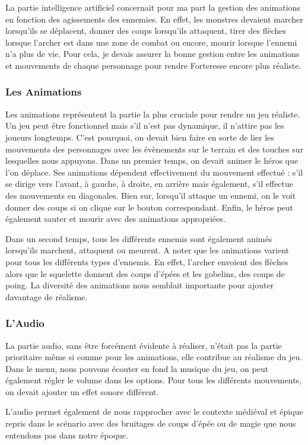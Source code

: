 \documentclass[a4paper, 12pt]{article}
\begin{document}
La partie intelligence artificiel concernait pour ma part la gestion des animations en fonction des agissements des ennemies. En effet, les monstres devaient marcher lorsqu’ils se déplacent, donner des coups lorsqu’ils attaquent, tirer des flèches lorsque l’archer est dans une zone de combat ou encore, mourir lorsque l’ennemi n’a plus de vie. Pour cela, je devais assurer la bonne gestion entre les animations et mouvements de chaque personnage pour rendre Forteresse encore plus réaliste.

		\subsubsection{Les Animations}

Les animations représentent la partie la plus cruciale pour rendre un jeu réaliste. Un jeu peut être fonctionnel mais s’il n’est pas dynamique, il n’attire pas les joueurs longtemps. C’est pourquoi, on devait bien faire en sorte de lier les mouvements des personnages avec les évènements sur le terrain et des touches sur lesquelles nous appuyons. Dans un premier temps, on devait animer le héros que l’on déplace. Ses animations dépendent effectivement du mouvement effectué : s’il se dirige vers l’avant, à gauche, à droite, en arrière mais également, s’il effectue des mouvements en diagonales. Bien sur, lorsqu’il attaque un ennemi, on le voit donner des coups si on clique sur le bouton correspondant. Enfin, le héros peut également sauter et mourir avec des animations appropriées.
\par Dans un second temps, tous les différents ennemis sont également animés lorsqu’ils marchent, attaquent ou meurent. A noter que les animations varient pour tous les différents types d’ennemis. En effet, l’archer envoient des flèches alors que le squelette donnent des coups d’épées et les gobelins, des coups de poing. La diversité des animations nous semblait importante pour ajouter davantage de réalisme.

		\subsubsection{L'Audio}

La partie audio, sans être forcément évidente à réaliser, n’était pas la partie prioritaire même si comme pour les animations, elle contribue au réalisme du jeu. Dans le menu, nous pouvons écouter en fond la musique du jeu, on peut également régler le volume dans les options.
Pour tous les différents mouvements, on devait ajouter un effet sonore différent. 
\par L’audio permet également de nous rapprocher avec le contexte médiéval et épique repris dans le scénario avec des bruitages de coups d’épée ou de magie que nous entendons pas dans notre époque.
\end{document}
